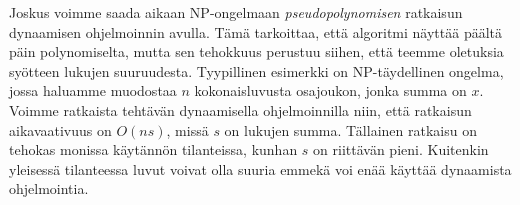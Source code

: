 Joskus voimme saada aikaan NP-ongelmaan \emph{pseudopolynomisen}
ratkaisun dynaamisen ohjelmoinnin avulla.
Tämä tarkoittaa, että algoritmi näyttää päältä päin polynomiselta,
mutta sen tehokkuus perustuu siihen,
että teemme oletuksia syötteen lukujen suuruudesta.
Tyypillinen esimerkki on NP-täydellinen ongelma,
jossa haluamme muodostaa $n$ kokonaisluvusta osajoukon,
jonka summa on $x$.
Voimme ratkaista tehtävän dynaamisella ohjelmoinnilla niin,
että ratkaisun aikavaativuus on $O(ns)$, missä $s$
on lukujen summa.
Tällainen ratkaisu on tehokas monissa käytännön tilanteissa,
kunhan $s$ on riittävän pieni.
Kuitenkin yleisessä tilanteessa luvut voivat olla
suuria emmekä voi enää käyttää dynaamista ohjelmointia.
